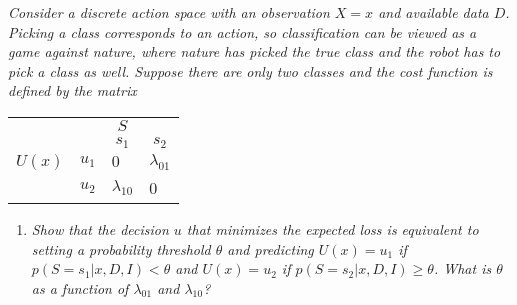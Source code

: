 	\begin{example}
		\emph{Consider a discrete action space with an observation $X=x$ and available data $D$. Picking a class corresponds to an action, so classification can be viewed as a game against nature, where nature has picked the true class and the robot has to pick a class as well. Suppose there are only two classes and the cost function is defined by the matrix}
		\begin{center}
			\begin{tabular}{ c  c  c  c }
				&& $S$& \\
				&& $s_1$ & $s_2$  \\
				\cline{3-4}
				$U(x)$ & $u_1$& \multicolumn{1}{|l}{$0$} &\multicolumn{1}{l|}{$\lambda_{01}$}  \\
				& $u_2$& \multicolumn{1}{|l}{$\lambda_{10}$} & \multicolumn{1}{l|}{0} \\
				\cline{3-4}
			\end{tabular}
		\end{center}
		\begin{enumerate}
			\item \emph{Show that the decision $u$ that minimizes the expected loss is equivalent to setting a probability threshold $\theta$ and predicting $U(x)=u_1$ if $p(S=s_1|x,D,I) < \theta$ and $U(x)=u_2$ if $p(S=s_2|x,D,I)\geq \theta$. What is $\theta$ as a function of $\lambda_{01}$ and $\lambda_{10}$?}\newline
			

\end{enumerate}
\end{example}
